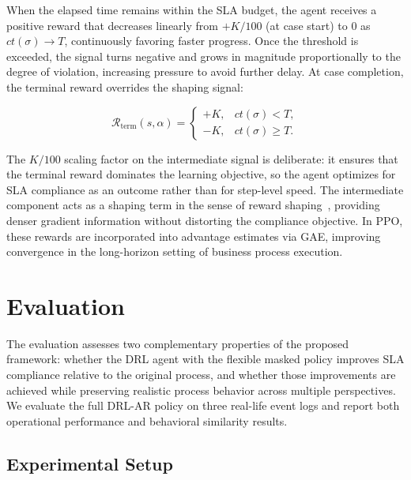 \documentclass[runningheads]{llncs}
\begin{document}
When the elapsed time remains within the SLA budget, the agent receives a
positive reward that decreases linearly from $+K/100$ (at case start) to $0$
as $ct(\sigma)\to T$, continuously favoring faster progress. Once the threshold
is exceeded, the signal turns negative and grows in magnitude proportionally to
the degree of violation, increasing pressure to avoid further delay. At case
completion, the terminal reward overrides the shaping signal:

\[
\mathcal{R}_{\text{term}}(s,\alpha)=
\begin{cases}
+K, & ct(\sigma)<T,\\
-K, & ct(\sigma)\ge T.
\end{cases}
\]

The $K/100$ scaling factor on the intermediate signal is deliberate: it ensures
that the terminal reward dominates the learning objective, so the agent
optimizes for SLA compliance as an outcome rather than for step-level speed.
The intermediate component acts as a shaping term in the sense of
reward shaping~\cite{sutton_2018_rl_intro}, providing denser gradient
information without distorting the compliance objective. In PPO, these rewards
are incorporated into advantage estimates via GAE, improving convergence in the
long-horizon setting of business process execution.

\section{Evaluation}
\label{sec:evaluation}

The evaluation assesses two complementary properties of the proposed 
framework: whether the DRL agent with the flexible masked policy 
improves SLA compliance relative to the original process, and whether 
those improvements are achieved while preserving realistic process 
behavior across multiple perspectives. We evaluate the full DRL-AR 
policy on three real-life event logs and report both operational 
performance and behavioral similarity results.

\subsection{Experimental Setup}
\label{subsec:setup}
\end{document}
